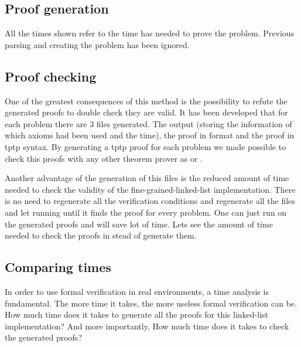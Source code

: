 \subsection{Proof generation}

All the times shown refer to the time \spass has needed to prove the problem. 
%
Previous parsing and creating the \spass problem has been ignored.



\subsection{Proof checking}

One of the greatest consequences of this method is the possibility to refute the generated proofs to double check they are valid.
%
It has been developed that for each \spass problem there are 3 files generated. The \spass output (storing the information of which axioms had been used and the time), the \spass proof in \spass format and the \spass proof in \gls{tptp} syntax.
%
By generating a tptp proof for each \spass problem we made possible to check this proofs with any other theorem prover as  or .

Another advantage of the generation of this files is the reduced amount of time needed to check the validity of the fine-grained-linked-list implementation. 
%
There is no need to regenerate all the verification conditions and regenerate all the \spass files and let \spass running until it finds the proof for every problem. 
%
One can just run \spass on the generated proofs and will save lot of time.
%
Lets see the amount of time needed to check the proofs in stead of generate them.


\subsection{Comparing times}

In order to use formal verification in real environments, a time analysis is fundamental. 
%
The more time it takes, the more useless formal verification can be.
%
How much time does it takes to generate all the proofs for this linked-list implementation? 
%
And more importantly,  How much time does it takes to check the generated proofs? 

